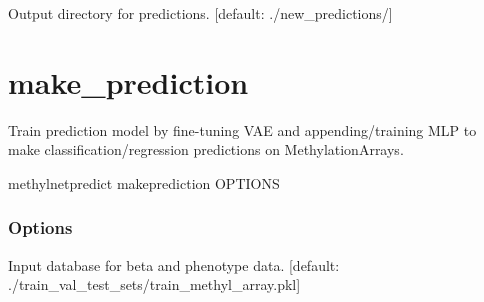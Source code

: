 \documentclass[letterpaper,10pt,english]{sphinxmanual}
\begin{document}
\begin{fulllineitems}
\label{\detokenize{index:cmdoption-methylnet-predict-make-new-predictions-o}}
Output directory for predictions.  {[}default: ./new\_predictions/{]}

\end{fulllineitems}



\section{make\_prediction}
\label{\detokenize{index:methylnet-predict-make-prediction}}
Train prediction model by fine-tuning VAE and appending/training MLP to make classification/regression predictions on MethylationArrays.

\begin{sphinxVerbatim}[commandchars=\\\{\}]
methylnet\PYGZhy{}predict make\PYGZus{}prediction \PYG{o}{[}OPTIONS\PYG{o}{]}
\end{sphinxVerbatim}
\subsubsection*{Options}

\begin{fulllineitems}
\label{\detokenize{index:cmdoption-methylnet-predict-make-prediction-i}}
Input database for beta and phenotype data.  {[}default: ./train\_val\_test\_sets/train\_methyl\_array.pkl{]}

\end{fulllineitems}
\end{document}

